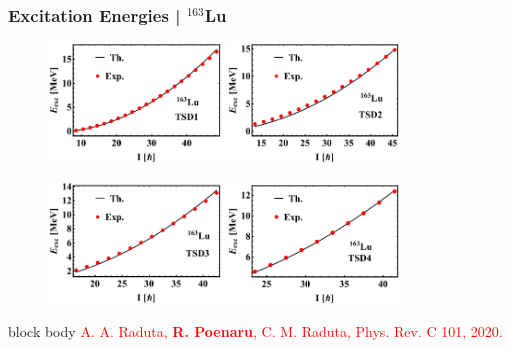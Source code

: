 \documentclass{beamer}
\begin{document}
\begin{frame}
	\frametitle{Excitation Energies | $^{163}$Lu}
	\begin{figure}
		\centering
		\includegraphics[width=0.41\textwidth]{figures/Lu-exp-energies/fig3a_lu163.pdf}
		\includegraphics[width=0.41\textwidth]{figures/Lu-exp-energies/fig3b_lu163.pdf}
	\end{figure}
	\vspace{-0.4cm}
	\begin{figure}
		\centering
		\includegraphics[width=0.41\textwidth]{figures/Lu-exp-energies/fig3c_lu163.pdf}
		\includegraphics[width=0.41\textwidth]{figures/Lu-exp-energies/fig3d_lu163.pdf}
	\end{figure}
	\vspace{-0.2cm}
	\begin{beamercolorbox}[rounded=true,shadow=false, wd=\linewidth,]{block body}
		\centering
		\textcolor{red}{\footnotesize{A. A. Raduta, \textbf{R. Poenaru}, C. M. Raduta, Phys. Rev. C 101, 2020.}}
	\end{beamercolorbox}
\end{frame}
\end{document}
